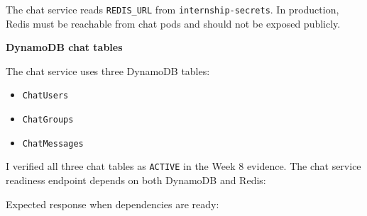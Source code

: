 \begin{Shaded}
\begin{Highlighting}[]
\DataTypeTok{\textbackslash{}}
  \DataTypeTok{\textbackslash{}}
\end{Highlighting}
\end{Shaded}

The chat service reads \texttt{REDIS\_\allowbreak{}URL} from
\texttt{internship-\allowbreak{}secrets}. In production, Redis must be reachable from
chat pods and should not be exposed publicly.

\vspace{0.5em}\noindent\textbf{DynamoDB chat tables}\par

The chat service uses three DynamoDB tables:

\begin{itemize}
\tightlist
\item
  \texttt{ChatUsers}
\item
  \texttt{ChatGroups}
\item
  \texttt{ChatMessages}
\end{itemize}

I verified all three chat tables as \texttt{ACTIVE} in the Week 8
evidence. The chat service readiness endpoint depends on both DynamoDB
and Redis:

\begin{Shaded}
\begin{Highlighting}[]
 
\end{Highlighting}
\end{Shaded}

Expected response when dependencies are ready:

\begin{Shaded}
\begin{Highlighting}[]
\FunctionTok{\{}\FunctionTok{:}\FunctionTok{,}\FunctionTok{:\{}\FunctionTok{:}\FunctionTok{,}\FunctionTok{:}\FunctionTok{\}\}}
\end{Highlighting}
\end{Shaded}

